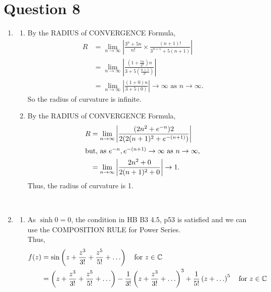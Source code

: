 \section{Question 8}
\begin{enumerate}[label=(\alph*)]
    \item
    \begin{enumerate}[label=(\roman*)]
        \item 
        By the RADIUS of CONVERGENCE Formula,
        \begin{align*}
            R &= \lim_{n\to\infty} \left| \frac{3^n + 5n}{n!} \times \frac{ (n+1)! }{ 3^{n+1} + 5(n+1) }  \right| \\
              &= \lim_{n\to\infty} \left| \frac{ \left(1 + \frac{5n}{3^n}\right)n }{ 3 + 5\left(\frac{n+1}{3^n}\right) } \right| \\
              &= \lim_{n\to\infty} \left| \frac{(1+0)n}{3 + 5(0)} \right| \to \infty \text{ as } n \to \infty.
        \end{align*}
        So the radius of curvature is infinite.
        \vvs \\
        \item 
        By the RADIUS of CONVERGENCE Formula,
        \begin{align*}
            R &= \lim_{n\to\infty} \left| \frac{ (2n^2 + e^{-n})2 }{ 2( 2(n+1)^2 + e^{-(n+1)} ) } \right| \\
            \intertext{but, as $e^{-n},e^{-(n+1)} \to \infty \text{ as } n \to \infty $,}
              &= \lim_{n\to\infty} \left|  \frac{ 2n^2 + 0 }{ 2(n+1)^2 + 0 } \right| \to 1.
        \end{align*}
        Thus, the radius of curvature is 1.
    \end{enumerate}
    \leavevmode \vvs \\
    \item 
    \begin{enumerate}[label=(\roman*)]
        \item 
        As $ \sinh 0 = 0 $, the condition in HB B3 4.5, p53 is satisfied and we can use the COMPOSITION RULE for Power Series.
        \vs \\
        Thus,
        \begin{align*}
           f(z) &= \sin\left( z + \frac{z^3}{3!} + \frac{z^5}{5!} + \ldots \right) \quad \text{for } z \in \C \\
             &= \left( z + \frac{z^3}{3!} + \frac{z^5}{5!} + \ldots \right) - \frac{1}{3!}\left( z + \frac{z^3}{3!} + \ldots \right)^3 + \frac{1}{5!}\left( z + \ldots \right)^5 \quad \text{for } z \in \C \\

\end{align*}
\end{enumerate}
\end{enumerate}
